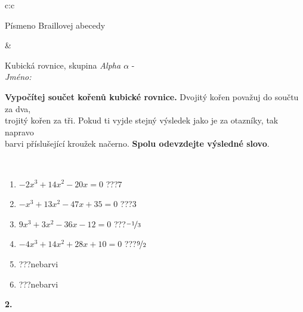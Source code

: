 \documentclass[10pt]{report}
\begin{document}
\begin{tabular}{c:c}
\begin{minipage}[c][104.5mm][t]{0.5\linewidth}
\begin{center}
\begin{minipage}{0.20\linewidth}
\begin{center}
{\small Písmeno Braillovej abecedy}
\end{center}
\end{minipage}
\end{center}
\end{minipage}
&
\begin{minipage}[c][104.5mm][t]{0.5\linewidth}
\begin{center}
\vspace{7mm}
{\huge Kubická rovnice, skupina \textit{Alpha $\alpha$} -}\\[5mm]
\textit{Jméno:}\phantom{xxxxxxxxxxxxxxxxxxxxxxxxxxxxxxxxxxxxxxxxxxxxxxxxxxxxxxxxxxxxxxxxx}\\[5mm]
\begin{minipage}{0.95\linewidth}
\begin{center}
\textbf{Vypočítej součet kořenů kubické rovnice.} Dvojitý kořen považuj do součtu za dva,\\trojitý kořen za tři. Pokud ti vyjde stejný výsledek jako je za otazníky, tak napravo\\barvi příslušející kroužek načerno. \textbf{Spolu odevzdejte výsledné slovo}.
\end{center}
\end{minipage}
\\[1mm]
\begin{minipage}{0.79\linewidth}
\begin{center}
\begin{varwidth}{\linewidth}
\begin{enumerate}
\Large
\item $-2x^3+14x^2-20x=0$\quad \dotfill\; ???\;\dotfill \quad $7$
\item $-x^3+13x^2-47x+35=0$\quad \dotfill\; ???\;\dotfill \quad $3$
\item $9x^3+3x^2-36x-12=0$\quad \dotfill\; ???\;\dotfill \quad $\nicefrac{-1}{3}$
\item $-4x^3+14x^2+28x+10=0$\quad \dotfill\; ???\;\dotfill \quad $\nicefrac{9}{2}$
\item \quad \dotfill\; ???\;\dotfill \quad nebarvi
\item \quad \dotfill\; ???\;\dotfill \quad nebarvi
\end{enumerate}
\end{varwidth}
\end{center}
\end{minipage}
\begin{minipage}{0.20\linewidth}
\begin{center}
{\Huge\bfseries 2.} \\[2mm]

\end{center}
\end{minipage}
\end{center}
\end{minipage}
\end{tabular}
\end{document}
